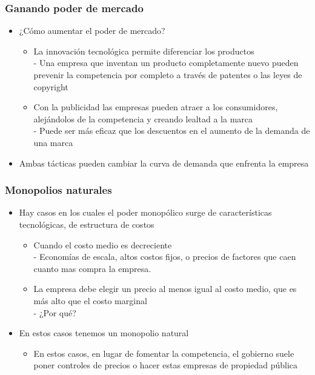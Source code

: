 \documentclass{beamer}
\begin{document}
\begin{frame}
\frametitle{Ganando poder de mercado}
\begin{itemize}
    \item ¿Cómo aumentar el poder de mercado?\vspace{2mm}
    \begin{itemize}
        \item La innovación tecnológica permite diferenciar los productos \\
        - Una empresa que inventan un producto completamente nuevo pueden prevenir la competencia por completo a través de patentes o las leyes de copyright\vspace{1mm}
        \item Con la publicidad las empresas pueden atraer a los consumidores, alejándolos de la competencia y creando lealtad a la marca \\      - Puede ser más eficaz que los descuentos en el aumento de la demanda de una marca\vspace{4mm}
        \end{itemize}
        \item Ambas tácticas pueden cambiar la curva de demanda que enfrenta la empresa
\end{itemize}
\end{frame}

\begin{frame}
\frametitle{Monopolios naturales}
\begin{itemize}
    \item Hay casos en los cuales el poder monopólico surge de características tecnológicas, de estructura de costos\vspace{2mm}
    \begin{itemize}
        \item Cuando el costo medio es decreciente \\
        - Economías de escala, altos costos fijos, o precios de factores que caen cuanto mas compra la empresa.\vspace{1mm}
        \item La empresa debe elegir un precio al menos igual al costo medio, que es más alto que el costo marginal \\
        - ¿Por qué?\vspace{4mm}
        \end{itemize}
    \item En estos casos tenemos un monopolio natural\vspace{2mm}
    \begin{itemize}
        \item En estos casos, en lugar de fomentar la competencia, el gobierno suele poner controles de precios o hacer estas empresas de propiedad pública
    \end{itemize}
    \end{itemize}
\end{frame}
\end{document}
